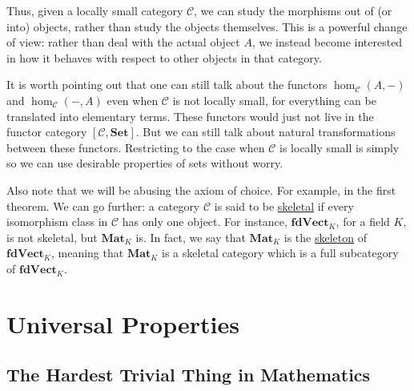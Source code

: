 \documentclass[a4paper,11pt]{article}
\theoremstyle{break_italics}
\theoremstyle{break_upright}
\theoremstyle{remark}
\newcommand{\C}{\mathcal{C}}
\newcommand{\Set}{\mathbf{Set}}
\begin{document}
Thus, given a locally small category $\C$, we can study the morphisms out of (or into) objects, rather than study the objects themselves. This is a powerful change of view: rather than deal with the actual object $A$, we instead become interested in how it behaves with respect to other objects in that category.

It is worth pointing out that one can still talk about the functors $\hom_\C(A, -)$ and $\hom_\C(-, A)$ even when $\C$ is not locally small, for everything can be translated into elementary terms. These functors would just not live in the functor category $[\C,\Set]$. But we can still talk about natural transformations between these functors. Restricting to the case when $\C$ is locally small is simply so we can use desirable properties of sets without worry.

Also note that we will be abusing the axiom of choice. For example, in the first theorem. We can go further: a category $\C$ is said to be \uline{skeletal} if every isomorphism class in $\C$ has only one object. For instance, $\mathbf{fdVect}_K$, for a field $K$, is not skeletal, but $\mathbf{Mat}_K$ is. In fact, we say that $\mathbf{Mat}_K$ is the \uline{skeleton} of $\mathbf{fdVect}_K$, meaning that $\mathbf{Mat}_K$ is a skeletal category which is a full subcategory of $\mathbf{fdVect}_K$.







\clearpage \newpage
\section{Universal Properties}


\subsection{The Hardest Trivial Thing in Mathematics}
\end{document}
